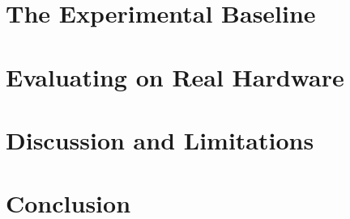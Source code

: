 \documentclass[letterpaper, 10 pt, conference]{ieeeconf}
\begin{document}
\section{The Experimental Baseline}
\label{sec:baseline}


\section{}
\label{sec:failures}


\section{}
\label{sec:harness}


\section{Evaluating \harness{} on Real Hardware}
\label{sec:evaluation}


\section{Discussion and Limitations}
\label{sec:discussion}


\section{Conclusion}
\label{sec:conclusion}




\end{document}
